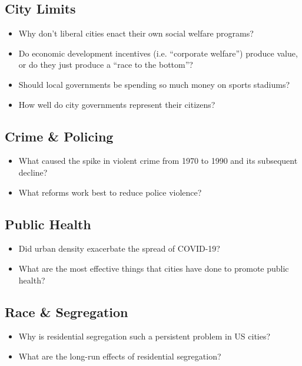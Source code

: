 \documentclass[11pt, letterpaper]{article}
\begin{document}
\subsection*{City Limits}

\begin{itemize}
	\item Why don't liberal cities enact their own social welfare programs? %
	\item Do economic development incentives (i.e. ``corporate welfare'') produce value, or do they just produce a ``race to the bottom''?
	\item Should local governments be spending so much money on sports stadiums?
	\item How well do city governments represent their citizens?
\end{itemize}

\subsection*{Crime \& Policing}

\begin{itemize}
	\item What caused the spike in violent crime from 1970 to 1990 and its subsequent decline?
	\item What reforms work best to reduce police violence?
\end{itemize}

\subsection*{Public Health}

\begin{itemize}
	\item Did urban density exacerbate the spread of COVID-19?
	\item What are the most effective things that cities have done to promote public health? %
\end{itemize}

\subsection*{Race \& Segregation}

\begin{itemize}
	\item Why is residential segregation such a persistent problem in US cities?
	\item What are the long-run effects of residential segregation? %
\end{itemize}
\end{document}
